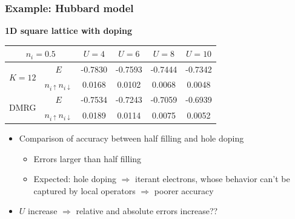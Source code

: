 \documentclass{beamer}
\begin{document}
\begin{frame}
\frametitle{Example: Hubbard model}

\textbf{1D square lattice with doping}

\begin{center}
    \begin{tabular}{cccccc}
        \toprule
        \multicolumn{2}{c}{$n_i=0.5$}                                 & $U=4$   & $U=6$   & $U=8$   & $U=10$  \\
        \midrule
        \multirow{2}{*}{$K=12$} & $E$                               & -0.7830 & -0.7593 & -0.7444 & -0.7342  \\
                                & $n_{i \uparrow} n_{i \downarrow}$ &  0.0168 &  0.0102 &  0.0068 &  0.0048  \\
        \midrule
        \multirow{2}{*}{DMRG}  & $E$                               & -0.7534 & -0.7243 & -0.7059 & -0.6939  \\
                                & $n_{i \uparrow} n_{i \downarrow}$ &  0.0189 &  0.0114 &  0.0075 &  0.0052  \\
        \bottomrule
    \end{tabular}
\end{center}

\begin{itemize}
    \item Comparison of accuracy between half filling and hole doping 
    \begin{itemize}
        \item Errors larger than half filling
        \item Expected: hole doping $\Rightarrow$ iterant electrons, whose behavior can't be captured by local operators $\Rightarrow$ poorer accuracy \checkmark
    \end{itemize}
    \item $U$ increase $\Rightarrow$ relative and absolute errors increase?? 
\end{itemize}

\end{frame}
\end{document}
